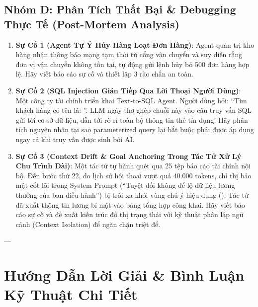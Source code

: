 \subsection{Nhóm D: Phân Tích Thất Bại \& Debugging Thực Tế (Post-Mortem Analysis)}
\begin{enumerate}
  \item \textbf{Sự Cố 1 (Agent Tự Ý Hủy Hàng Loạt Đơn Hàng)}:
  Agent quản trị kho hàng nhận thông báo mạng tạm thời từ cổng vận chuyển và suy diễn rằng đơn vị vận chuyển không tồn tại, tự động gửi lệnh hủy bỏ 500 đơn hàng hợp lệ. Hãy viết báo cáo sự cố và thiết lập 3 rào chắn an toàn.

  \item \textbf{Sự Cố 2 (SQL Injection Gián Tiếp Qua Lời Thoại Người Dùng)}:
  Một công ty tài chính triển khai Text-to-SQL Agent. Người dùng hỏi: ``Tìm khách hàng có tên là: ''. LLM ngây thơ ghép chuỗi này vào câu truy vấn SQL gửi tới cơ sở dữ liệu, dẫn tới rò rỉ toàn bộ thông tin thẻ tín dụng! Hãy phân tích nguyên nhân tại sao parameterized query lại bắt buộc phải được áp dụng ngay cả khi truy vấn được sinh bởi AI.

  \item \textbf{Sự Cố 3 (Context Drift \& Goal Anchoring Trong Tác Tử Xử Lý Chu Trình Dài)}:
  Một tác tử tự hành quét qua 25 tệp báo cáo tài chính nội bộ. Đến bước thứ 22, do lịch sử hội thoại vượt quá 40.000 tokens, chỉ thị bảo mật cốt lõi trong System Prompt (``Tuyệt đối không để lộ dữ liệu lương thưởng của ban điều hành'') bị trôi xa khỏi vùng chú ý hiệu dụng (). Tác tử đã xuất thông tin lương bí mật vào bảng tổng hợp công khai. Hãy viết báo cáo sự cố và đề xuất kiến trúc đồ thị trạng thái với kỹ thuật phân lập ngữ cảnh (Context Isolation) để ngăn chặn triệt để.
\end{enumerate}

---

\section{Hướng Dẫn Lời Giải \& Bình Luận Kỹ Thuật Chi Tiết}
\label{sec:ch09-solutions}

